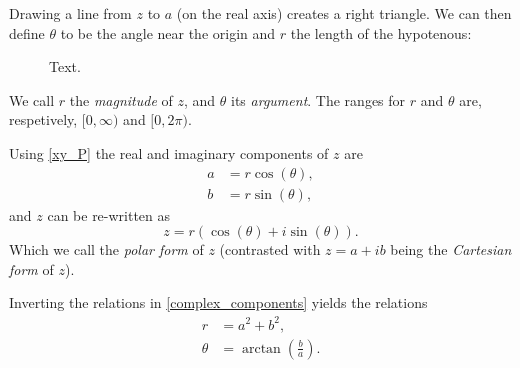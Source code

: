 Drawing a line from $z$ to $a$ (on the real axis) creates a right triangle. We can then define $\theta$ to be the angle near the origin and $r$ the length of the hypotenous:
\begin{figure}
	\centering
	\caption{Text.}
	\label{fig:complex number 2}
\end{figure}
We call $r$ the \emph{magnitude} of $z$, and $\theta$ its \emph{argument}. The ranges for $r$ and $\theta$ are, respetively, $[0,\infty)$ and $[0,2\pi)$.

Using \eqref{xy_P} the real and imaginary components of $z$ are
\begin{align}
	a &= r\cos(\theta),\nonumber\\
	b &= r\sin(\theta),
	\label{eq:complex_components}
\end{align}
and $z$ can be re-written as
\begin{equation}
	z = r\left( \cos(\theta) + i\sin(\theta) \right).
	\label{eq:complex_geometric_form}
\end{equation}
Which we call the \emph{polar form} of $z$ (contrasted with $z=a+ib$ being the \emph{Cartesian form} of $z$).

Inverting the relations in \eqref{complex_components} yields the relations
\begin{align}
	r &= a^{2}+b^{2},\nonumber\\
	\theta &= \arctan\left(\frac{b}{a}\right).
	\label{eq:complex_components_geometric}
\end{align}

